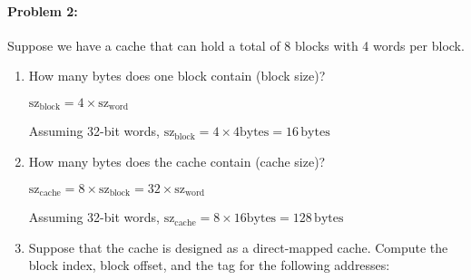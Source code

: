 \documentclass[12pt,letterpaper,titlepage]{article}
\begin{document}
\begin{raggedright}
\clearpage
\paragraph{Problem 2: }
Suppose we have a cache that can hold a total of 8 blocks with 4 words per block.

\begin{enumerate}
    \item How many bytes does one block contain (block size)?

	$\text{sz}_\text{block} = 4\times \text{sz}_\text{word}$

	Assuming 32-bit words, $\text{sz}_\text{block} = 4\times 4 \text{bytes} = 16\,\text{bytes}$
	
    \item How many bytes does the cache contain (cache size)?

	$\text{sz}_\text{cache} = 8\times \text{sz}_\text{block} = 32\times \text{sz}_\text{word}$

	Assuming 32-bit words, $\text{sz}_\text{cache} = 8\times 16 \text{bytes} = 128\,\text{bytes}$
    
    \item Suppose that the cache is designed as a direct-mapped cache. Compute the block index, block offset, and the tag for the following addresses:


\end{enumerate}
\end{raggedright}
\end{document}
